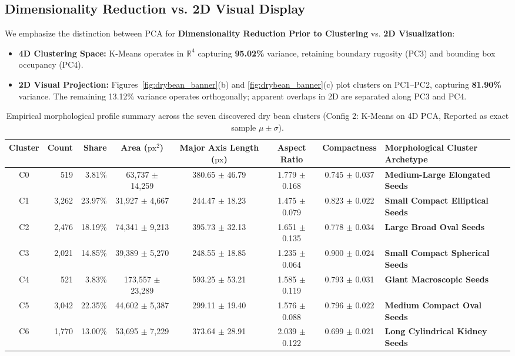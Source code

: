 \documentclass[9.5pt,twocolumn,letterpaper]{article}
\newcommand{\R}{\mathbb{R}}
\begin{document}
\subsection{Dimensionality Reduction vs. 2D Visual Display}
We emphasize the distinction between PCA for \textbf{Dimensionality Reduction Prior to Clustering} vs. \textbf{2D Visualization}:
\begin{itemize}
  \item \textbf{4D Clustering Space:} K-Means operates in $\R^4$ capturing \textbf{95.02\%} variance, retaining boundary rugosity (PC3) and bounding box occupancy (PC4).
  \item \textbf{2D Visual Projection:} Figures~\ref{fig:drybean_banner}(b) and \ref{fig:drybean_banner}(c) plot clusters on PC1--PC2, capturing \textbf{81.90\%} variance. The remaining 13.12\% variance operates orthogonally; apparent overlaps in 2D are separated along PC3 and PC4.
\end{itemize}

\begin{table}[t]
\centering
\footnotesize
\setlength{\tabcolsep}{3.0pt}
\renewcommand{\arraystretch}{1.1}
\begin{tabular*}{\textwidth}{@{\extracolsep{\fill}}c r r c c c c l@{}}
\toprule
\textbf{Cluster} & \textbf{Count} & \textbf{Share} & \textbf{Area ($\text{px}^2$)} & \makecell[c]{\textbf{Major Axis}\\\textbf{Length ($\text{px}$)}} & \makecell[c]{\textbf{Aspect}\\\textbf{Ratio}} & \textbf{Compactness} & \textbf{Morphological Cluster Archetype} \\
\midrule
C0 & 519 & 3.81\% & 63,737 $\pm$ 14,259 & 380.65 $\pm$ 46.79 & 1.779 $\pm$ 0.168 & 0.745 $\pm$ 0.037 & \textbf{Medium-Large Elongated Seeds} \\
C1 & 3,262 & 23.97\% & 31,927 $\pm$ 4,667 & 244.47 $\pm$ 18.23 & 1.475 $\pm$ 0.079 & 0.823 $\pm$ 0.022 & \textbf{Small Compact Elliptical Seeds} \\
C2 & 2,476 & 18.19\% & 74,341 $\pm$ 9,213 & 395.73 $\pm$ 32.13 & 1.651 $\pm$ 0.135 & 0.778 $\pm$ 0.034 & \textbf{Large Broad Oval Seeds} \\
C3 & 2,021 & 14.85\% & 39,389 $\pm$ 5,270 & 248.55 $\pm$ 18.85 & 1.235 $\pm$ 0.064 & 0.900 $\pm$ 0.024 & \textbf{Small Compact Spherical Seeds} \\
C4 & 521 & 3.83\% & 173,557 $\pm$ 23,289 & 593.25 $\pm$ 53.21 & 1.585 $\pm$ 0.119 & 0.793 $\pm$ 0.031 & \textbf{Giant Macroscopic Seeds} \\
C5 & 3,042 & 22.35\% & 44,602 $\pm$ 5,387 & 299.11 $\pm$ 19.40 & 1.576 $\pm$ 0.088 & 0.796 $\pm$ 0.022 & \textbf{Medium Compact Oval Seeds} \\
C6 & 1,770 & 13.00\% & 53,695 $\pm$ 7,229 & 373.64 $\pm$ 28.91 & 2.039 $\pm$ 0.122 & 0.699 $\pm$ 0.021 & \textbf{Long Cylindrical Kidney Seeds} \\
\bottomrule
\end{tabular*}
\caption{Empirical morphological profile summary across the seven discovered dry bean clusters (Config 2: K-Means on 4D PCA, Reported as exact sample $\mu \pm \sigma$).}
\label{tab:cluster_profiles}
\end{table}
\end{document}
